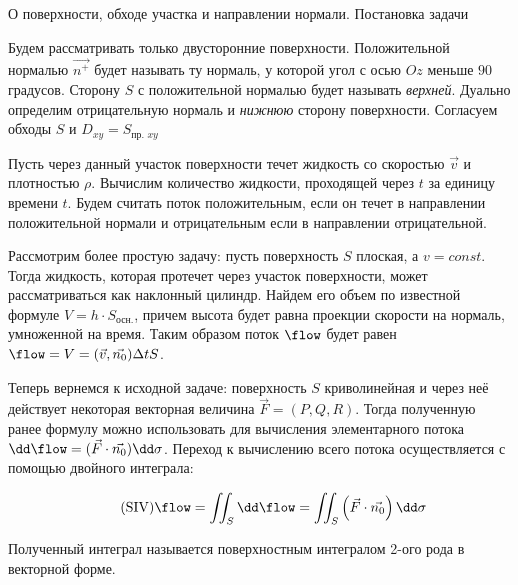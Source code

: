 
\begin{remark}
  О поверхности, обходе участка и направлении нормали. Постановка задачи

  \begin{twocolumns}
    
    \columnbreak

    Будем рассматривать только двусторонние поверхности. Положительной
    нормалью \(\vec{n^{+}}\) будет называть ту нормаль, у которой угол с осью
    \(Oz\) меньше \(90\) градусов. Сторону \(S\) с положительной нормалью
    будет называть \textit{верхней}. Дуально определим отрицательную нормаль и
    \textit{нижнюю} сторону поверхности. Согласуем обходы \(S\) и
    \(D_{xy} = S_{\text{пр. }xy}\)

    Пусть через данный участок поверхности течет жидкость со скоростью
    \(\vec{v}\) и плотностью \(\rho\). Вычислим количество жидкости, проходящей
    через \(t\) за единицу времени \(t\). Будем считать поток положительным,
    если он течет в направлении положительной нормали и отрицательным если в 
    направлении отрицательной.

    \vfill\null
  \end{twocolumns}
\end{remark}

Рассмотрим более простую задачу: пусть поверхность \(S\) плоская, а
\(v = const\). Тогда жидкость, которая протечет через участок поверхности, может
рассматриваться как наклонный цилиндр. Найдем его объем по известной формуле
\(V = h \cdot S_{\text{осн.}}\), причем высота будет равна проекции скорости на
нормаль, умноженной на время. Таким образом поток \(\flow\) будет равен
\(\flow = V = (\vec{v}, \vec{n_{0}}) \Delta t S\).

Теперь вернемся к исходной задаче: поверхность \(S\) криволинейная и через неё
действует некоторая векторная величина \(\vec{F} = (P, Q, R)\). Тогда полученную
ранее формулу можно использовать для вычисления элементарного потока
\(\dd \flow = (\vec{F} \cdot \vec{n_{0}}) \dd \sigma\). Переход к вычислению
всего потока осуществляется с помощью двойного интеграла:

\begin{align*}\label{eq:surf-int-vec}\tag{SIV}
  \flow
  = \iint_{S} \dd \flow
  = \iint_{S} \left( \vec{F} \cdot \vec{n_{0}} \right) \dd \sigma 
\end{align*}

Полученный интеграл называется поверхностным интегралом 2-ого рода в векторной
форме.

